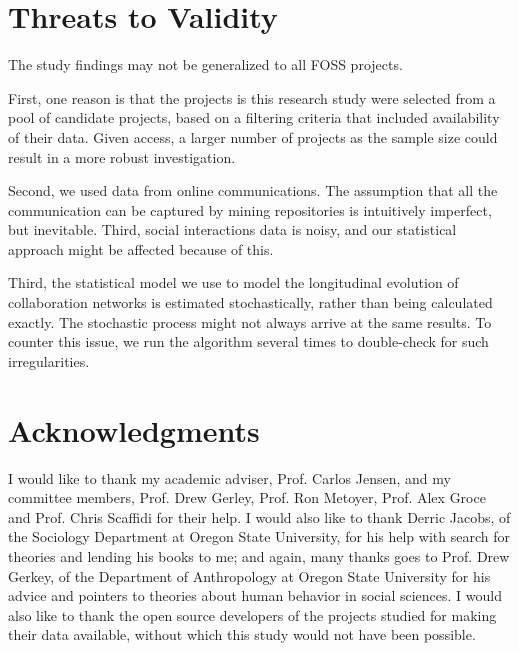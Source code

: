 \documentclass[12pt]{report}
\begin{document}
\pagebreak

\section{Threats to Validity}
\label{threatsToValidity}
The study findings may not be generalized to all FOSS projects. 

First, one reason is that the projects is this research study were selected from a pool of candidate projects, based on a filtering criteria that included availability of their data. Given access, a larger number of projects as the sample size could result in a more robust investigation. 

Second, we used data from online communications. The assumption that all the communication can be captured by mining repositories is intuitively imperfect, but inevitable. Third, social interactions data is noisy, and our statistical approach might be affected because of this. 

Third, the statistical model we use to model the longitudinal evolution of collaboration networks is estimated stochastically, rather than being calculated exactly. The stochastic process might not always arrive at the same results. To counter this issue, we run the algorithm several times to double-check for such irregularities.


\section*{Acknowledgments}
\label{acknowledgments}
I would like to thank my academic adviser, Prof. Carlos Jensen, and my committee members, Prof. Drew Gerley, Prof. Ron Metoyer, Prof. Alex Groce and Prof. Chris Scaffidi for their help. I would also like to thank Derric Jacobs, of the Sociology Department at Oregon State University, for his help with search for theories and lending his books to me; and again, many thanks goes to Prof. Drew Gerkey, of the Department of Anthropology at Oregon State University for his advice and pointers to theories about human behavior in social sciences. I would also like to thank the open source developers of the projects studied for making their data available, without which this study would not have been possible. \\


%
\end{document}
